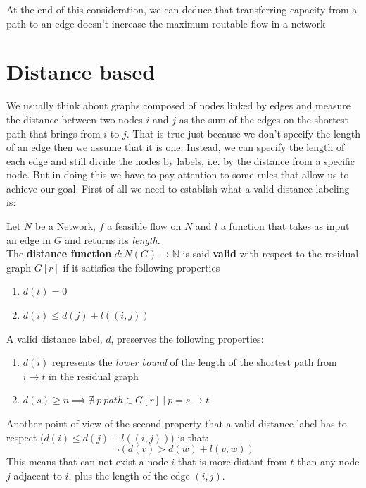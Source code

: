 At the end of this consideration, we can deduce that transferring capacity from a path to an edge doesn't increase the maximum routable flow in a network
\newpage
\section{Distance based}
We usually think about graphs composed of nodes linked by edges and measure the distance between two nodes $i$ and $j$ as the sum of the edges on the shortest path that brings from $i$ to $j$. That is true just because we don't specify the length of an edge then we assume that it is one. Instead, we can specify the length of each edge and still divide the nodes by labels, i.e. by the distance from a specific node. But in doing this we have to pay attention to some rules that allow us to achieve our goal.
First of all we need to establish what a valid distance labeling is:
\begin{definition}
    \label{VDL}
    Let $N$ be a Network, $f$ a feasible flow on $N$ and $l$ a function that takes as input an edge in $G$ and returns its \textit{length}.\\
    The \textbf{distance function} $d: N(G) \rightarrow \mathbb{N}$ is said \textbf{valid} with respect to the residual graph $G[r]$ if it satisfies the following properties 
    \begin{enumerate}
        \item $d(t) = 0$
        \item $d(i) \le d(j) + l((i,j))$
    \end{enumerate}
\end{definition}

\begin{obs}
    A valid distance label, $d$, preserves the following properties:
    \begin{enumerate}
        \item $d(i)$ represents the \textit{lower bound} of the length of the shortest path from $i \rightarrow t$
        in the residual graph
        \item $d(s) \ge n \implies \nexists\ p\ path \in G[r]\ |\ p = s \rightarrow t $ 
    \end{enumerate}
    
\end{obs}
Another point of view of the second property that a valid distance label has to respect ($d(i) \le d(j) + l((i,j))$) is that:
\[\neg (d(v) > d(w) + l(v,w))\]
This means that can not exist a node $i$ that is more distant from $t$ than any node $j$ adjacent to $i$, plus the length of the edge $(i,j)$.

